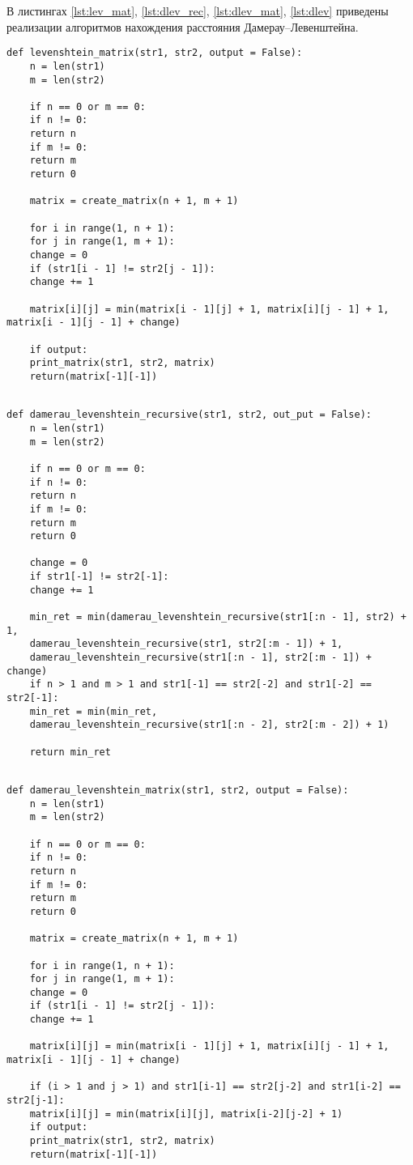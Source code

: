 В листингах \ref{lst:lev_mat}, \ref{lst:dlev_rec}, \ref{lst:dlev_mat}, \ref{lst:dlev} приведены реализации алгоритмов нахождения расстояния Дамерау--Левенштейна.
\newpage
\begin{lstlisting}[label=lst:lev_mat,caption=Функция нахождения расстояния Левенштейна с использованием матрицы.]
	def levenshtein_matrix(str1, str2, output = False):
	n = len(str1)
	m = len(str2)
	
	if n == 0 or m == 0:
	if n != 0:
	return n
	if m != 0:
	return m
	return 0
	
	matrix = create_matrix(n + 1, m + 1)
	
	for i in range(1, n + 1):
	for j in range(1, m + 1):
	change = 0 
	if (str1[i - 1] != str2[j - 1]):
	change += 1
	
	matrix[i][j] = min(matrix[i - 1][j] + 1, matrix[i][j - 1] + 1, matrix[i - 1][j - 1] + change)
	
	if output:        
	print_matrix(str1, str2, matrix)
	return(matrix[-1][-1])
	
\end{lstlisting}
\newpage
\begin{lstlisting}[label=lst:dlev_rec,caption=Функция нахождения расстояния Дамерау-Левенштейна с использованием рекурсии.]
	def damerau_levenshtein_recursive(str1, str2, out_put = False):
	n = len(str1)
	m = len(str2)
	
	if n == 0 or m == 0:
	if n != 0:
	return n
	if m != 0:
	return m
	return 0
	
	change = 0
	if str1[-1] != str2[-1]:
	change += 1
	
	min_ret = min(damerau_levenshtein_recursive(str1[:n - 1], str2) + 1,
	damerau_levenshtein_recursive(str1, str2[:m - 1]) + 1,
	damerau_levenshtein_recursive(str1[:n - 1], str2[:m - 1]) + change)
	if n > 1 and m > 1 and str1[-1] == str2[-2] and str1[-2] == str2[-1]:
	min_ret = min(min_ret,
	damerau_levenshtein_recursive(str1[:n - 2], str2[:m - 2]) + 1)
	
	return min_ret
	
\end{lstlisting}
\newpage
\begin{lstlisting}[label=lst:dlev_mat,caption=Функция нахождения расстояния Дамерау-Левенштейна с использованием матрицы.]
	def damerau_levenshtein_matrix(str1, str2, output = False):
	n = len(str1)
	m = len(str2)
	
	if n == 0 or m == 0:
	if n != 0:
	return n
	if m != 0:
	return m
	return 0
	
	matrix = create_matrix(n + 1, m + 1)
	
	for i in range(1, n + 1):
	for j in range(1, m + 1):
	change = 0 
	if (str1[i - 1] != str2[j - 1]):
	change += 1
	
	matrix[i][j] = min(matrix[i - 1][j] + 1, matrix[i][j - 1] + 1, matrix[i - 1][j - 1] + change)
	
	if (i > 1 and j > 1) and str1[i-1] == str2[j-2] and str1[i-2] == str2[j-1]:
	matrix[i][j] = min(matrix[i][j], matrix[i-2][j-2] + 1)
	if output:        
	print_matrix(str1, str2, matrix)
	return(matrix[-1][-1])
	
\end{lstlisting}
